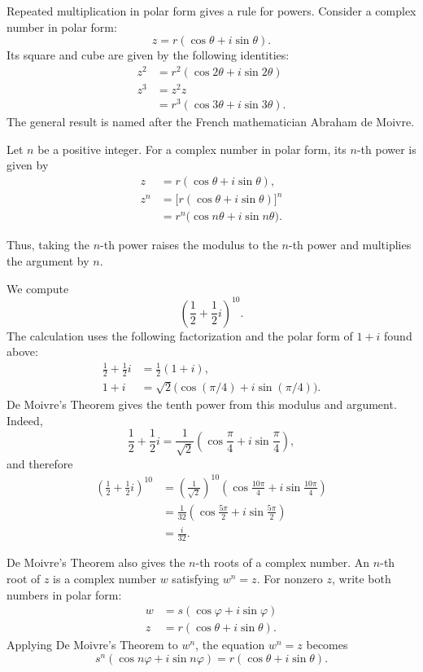Repeated multiplication in polar form gives a rule for powers. Consider a complex number in polar form:
\[
z = r(\cos\theta + i\sin\theta).
\]
Its square and cube are given by the following identities:
\[
\begin{aligned}
z^2 &= r^2(\cos 2\theta + i \sin 2\theta) \\
z^3 &= z^2 z \\
&= r^3(\cos 3\theta + i \sin 3\theta).
\end{aligned}
\]
The general result is named after the French mathematician Abraham de Moivre.

\begin{theorem}
Let $n$ be a positive integer. For a complex number in polar form, its $n$-th power is given by
\[
\begin{aligned}
z &= r(\cos\theta + i\sin\theta), \\
z^n &= \big[ r (\cos\theta + i \sin \theta) \big]^n \\
&= r^n \big( \cos n\theta + i \sin n\theta \big).
\end{aligned}
\]

\end{theorem}

Thus, taking the $n$-th power raises the modulus to the $n$-th power and multiplies the argument by $n$.

\begin{example}
We compute
\[
\left( \frac{1}{2} + \frac{1}{2}i \right)^{10}.
\]
The calculation uses the following factorization and the polar form of $1+i$ found above:
\[
\begin{aligned}
\frac{1}{2} + \frac{1}{2}i &= \frac{1}{2}(1+i), \\
1+i &= \sqrt{2}\big(\cos(\pi/4) + i\sin(\pi/4)\big).
\end{aligned}
\]
De Moivre's Theorem gives the tenth power from this modulus and argument.
Indeed,
\[
\frac12+\frac12i
=\frac{1}{\sqrt2}\left(\cos\frac{\pi}{4}+i\sin\frac{\pi}{4}\right),
\]
and therefore
\[
\begin{aligned}
\left(\frac12+\frac12i\right)^{10}
&=\left(\frac{1}{\sqrt2}\right)^{10}
\left(\cos\frac{10\pi}{4}+i\sin\frac{10\pi}{4}\right)\\
&=\frac1{32}\left(\cos\frac{5\pi}{2}+i\sin\frac{5\pi}{2}\right)\\
&=\frac{i}{32}.
\end{aligned}
\]
\end{example}

De Moivre's Theorem also gives the $n$-th roots of a complex number. An $n$-th root of $z$ is a complex number $w$ satisfying $w^n = z$.
For nonzero $z$, write both numbers in polar form:
\[
\begin{aligned}
w &= s(\cos\varphi + i\sin\varphi) \\
z &= r(\cos\theta + i\sin\theta).
\end{aligned}
\]
Applying De Moivre's Theorem to $w^n$, the equation $w^n = z$ becomes
\[
s^n(\cos n\varphi + i \sin n\varphi) = r(\cos\theta + i \sin\theta).
\]

